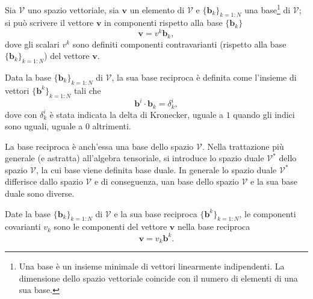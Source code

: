 \begin{definition}
Sia $\mathcal{V}$ uno spazio vettoriale, sia $\bm{v}$ un elemento di $\mathcal{V}$
 e $\{ \bm{b}_k \}_{k=1:N}$ una base\footnote{Una base è un insieme minimale di vettori linearmente indipendenti. La dimensione dello spazio vettoriale coincide con il numero di elementi di una sua base.} di $\mathcal{V}$; si può scrivere il vettore $\bm{v}$ in componenti rispetto alla base $\{ \bm{b}_k \}$
\begin{equation}
  \bm{v} = v^k \bm{b}_k ,
\end{equation}
 dove gli scalari $v^k$ sono definiti componenti contravarianti (rispetto alla base $\{ \bm{b}_k \}_{k=1:N}$) del vettore $\bm{v}$.
\end{definition}
%
\begin{definition}
Data la base $\{ \bm{b}_k \}_{k=1:N}$ di $\mathcal{V}$, la sua
 base reciproca è definita come l'insieme di vettori $\{ \bm{b}^k \}_{k=1:N}$ tali che
\begin{equation}\label{eqn:defBaseReciproca}
  \bm{b}^i \cdot \bm{b}_k = \delta_k^i ,
\end{equation}
 dove con $\delta_k^i$ è stata indicata la delta di Kronecker, uguale a $1$ quando gli indici sono uguali, uguale a $0$ altrimenti.
\end{definition}
\begin{remark}
 La base reciproca è anch'essa una base dello spazio $\mathcal{V}$. Nella trattazione più generale (e astratta) all'algebra tensoriale, si introduce lo spazio duale $\mathcal{V}^*$ dello spazio $\mathcal{V}$, la cui base viene definita base duale. In generale lo spazio duale $\mathcal{V}^*$ differisce dallo spazio $\mathcal{V}$ e di conseguenza, uan base dello spazio $\mathcal{V}$ e la sua base duale sono diverse.
\end{remark}
%
\begin{definition}
Date la base $\{ \bm{b}_k \}_{k=1:N}$ di $\mathcal{V}$ e la sua base reciproca $\{ \bm{b}^k \}_{k=1:N}$, le componenti covarianti $v_k$ sono le componenti del vettore $\bm{v}$ nella base reciproca
 \begin{equation}\label{eqn:def:bd}
   \bm{v} =v_k \bm{b}^k .
 \end{equation}
\end{definition}
%
